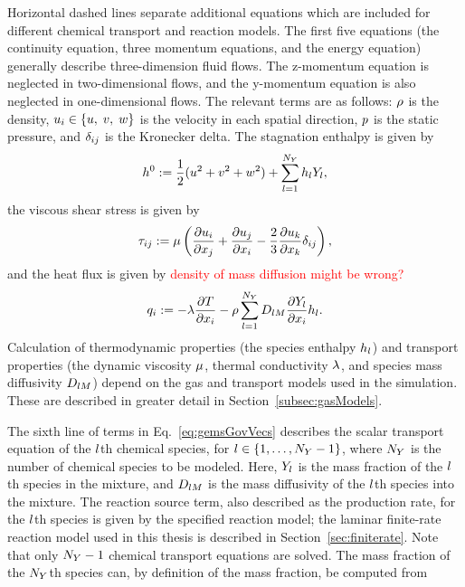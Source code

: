 Horizontal dashed lines separate additional equations which are included for different chemical transport and reaction models. The first five equations (the continuity equation, three momentum equations, and the energy equation) generally describe three-dimension fluid flows. The z-momentum equation is neglected in two-dimensional flows, and the y-momentum equation is also neglected in one-dimensional flows. The relevant terms are as follows: $\rho$ is the density, $u_{i} \in \{u, \; v, \; w\}$ is the velocity in each spatial direction, $p$ is the static pressure, and $\delta_{i j}$ is the Kronecker delta. The stagnation enthalpy is given by
\begin{equation}\label{eq:stagEnth}
	h^0 := \frac{1}{2} (u^2 + v^2 + w^2) + \sum_{l = 1}^{N_Y} h_{l} Y_{l},
\end{equation}
the viscous shear stress is given by
\begin{equation}\label{eq:shearStress}
	\tau_{i j} := \mu \left( \frac{\partial u_{i}}{\partial x_{j}} + \frac{\partial u_{j}}{\partial x_{i}} - \frac{2}{3} \frac{\partial u_{k}}{\partial x_{k}} \delta_{i j} \right),
\end{equation}
and the heat flux is given by \textcolor{red}{density of mass diffusion might be wrong?}
\begin{equation}\label{eq:heatFlux}
	q_{i} := -\lambda \frac{\partial T}{\partial x_{i}} - \rho \sum_{l = 1}^{N_Y} D_{l M} \frac{\partial Y_{l}}{\partial x_{i}} h_{l}.
\end{equation}
Calculation of thermodynamic properties (the species enthalpy $h_{l}$) and transport properties (the dynamic viscosity $\mu$, thermal conductivity $\lambda$, and species mass diffusivity $D_{l M}$) depend on the gas and transport models used in the simulation. These are described in greater detail in Section~\ref{subsec:gasModels}.

The sixth line of terms in Eq.~\ref{eq:gemsGovVecs} describes the scalar transport equation of the $l$th chemical species, for $l \in \{1, \hdots, N_Y - 1\}$, where $N_Y$ is the number of chemical species to be modeled. Here, $Y_{l}$ is the mass fraction of the $l$th species in the mixture, and $D_{l M}$ is the mass diffusivity of the $l$th species into the mixture. The reaction source term, also described as the production rate, for the $l$th species is given by the specified reaction model; the laminar finite-rate reaction model used in this thesis is described in Section~\ref{sec:finiterate}. Note that only $N_Y - 1$ chemical transport equations are solved. The mass fraction of the $N_Y$th species can, by definition of the mass fraction, be computed from

